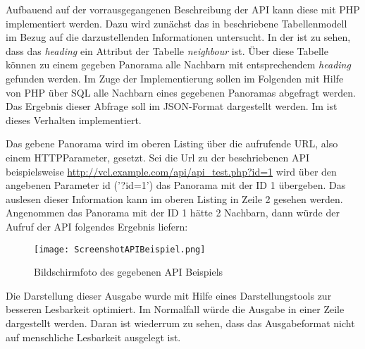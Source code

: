 
Aufbauend auf der vorrausgegangenen Beschreibung der API kann diese mit PHP implementiert werden. Dazu wird zunächst das in  beschriebene Tabellenmodell im Bezug auf die darzustellenden Informationen untersucht. In der  ist zu sehen, dass das \textit{heading} ein Attribut der Tabelle \textit{neighbour} ist. Über diese Tabelle können zu einem gegeben Panorama alle Nachbarn mit entsprechendem \textit{heading} gefunden werden. 
Im Zuge der Implementierung sollen im Folgenden mit Hilfe von PHP über SQL alle Nachbarn eines gegebenen Panoramas abgefragt werden. Das Ergebnis dieser Abfrage soll im JSON-Format dargestellt werden.
Im  ist dieses Verhalten implementiert.

\clearpage



Das gebene Panorama wird im oberen Listing über die aufrufende URL, also einem HTTP\footnotemark Parameter, gesetzt. Sei die Url zu der beschriebenen API beispielsweise \url{http://vcl.example.com/api/api\_test.php?id=1} wird über den angebenen Parameter id ('?id=1') das Panorama mit der ID 1 übergeben. Das auslesen dieser Information kann im oberen Listing in Zeile 2 gesehen werden. Angenommen das Panorama mit der ID 1 hätte 2 Nachbarn, dann würde der Aufruf der API folgendes Ergebnis liefern:


\begin{figure}[htb]
\centering
\texttt{[image: ScreenshotAPIBeispiel.png]}
\caption[API Beispiel]{Bildschirmfoto des gegebenen API Beispiels}
\label{fig:ScreenshotAPIBeispiel}
\end{figure}

Die Darstellung dieser Ausgabe wurde mit Hilfe eines Darstellungstools zur besseren Lesbarkeit optimiert. Im Normalfall würde die Ausgabe in einer Zeile dargestellt werden. Daran ist wiederrum zu sehen, dass das Ausgabeformat nicht auf menschliche Lesbarkeit ausgelegt ist.

